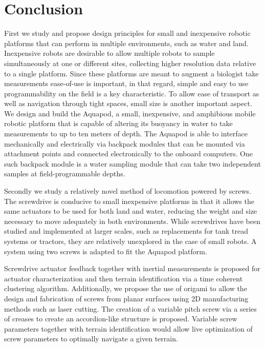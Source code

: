 \section{Conclusion}
\label{sec:conclusion}

First we study and propose design principles for small and inexpensive robotic platforms that can perform in multiple environments, such as water and land. Inexpensive robots are desirable to allow multiple robots to sample simultaneously at one or different sites, collecting higher resolution data relative to a single platform. Since these platforms are meant to augment a biologist take measurements ease-of-use is important, in that regard, simple and easy to use programmability on the field is a key characteristic. To allow ease of transport as well as navigation through tight spaces, small size is another important aspect. We design and build the Aquapod, a small, inexpensive, and amphibious mobile robotic platform that is capable of altering its buoyancy in water to take measurements to up to ten meters of depth. The Aquapod is able to interface mechanically and electrically via backpack modules that can be mounted via attachment points and connected electronically to the onboard computers. One such backpack module is a water sampling module that can take two independent samples at field-programmable depths. 

Secondly we study a relatively novel method of locomotion powered by screws. The screwdrive is conducive to small inexpensive platforms in that it allows the same actuators to be used for both land and water, reducing the weight and size necessary to move adequately in both environments. While screwdrives have been studied and implemented at larger scales, such as replacements for tank tread systems or tractors, they are relatively unexplored in the case of small robots. A system using two screws is adapted to fit the Aquapod platform. 

Screwdrive actuator feedback together with inertial measurements is proposed for actuator characterization and then terrain identification via a time coherent clustering algorithm. Additionally, we propose the use of origami to allow the design and fabrication of screws from planar surfaces using 2D manufacturing methods such as laser cutting. The creation of a variable pitch screw via a series of creases to create an accordion-like structure is proposed. Variable screw parameters together with terrain identification would allow live optimization of screw parameters to optimally navigate a given terrain. 


